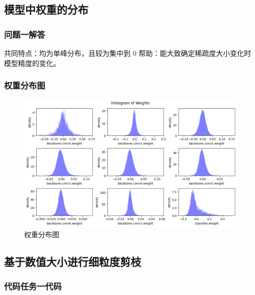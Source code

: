\documentclass{article}
\begin{document}
\subsection{模型中权重的分布}

\subsubsection{问题一解答}

共同特点：均为单峰分布，且较为集中到 0  
帮助：能大致确定稀疏度大小变化时模型精度的变化。

\subsubsection{权重分布图}

\begin{figure}[H]
    \centering
    \includegraphics[width=1\textwidth]{output.png}
    \caption{权重分布图}
\end{figure}

\subsection{基于数值大小进行细粒度剪枝}

\subsubsection{代码任务一代码}
\end{document}
